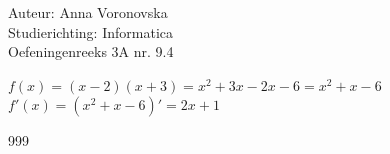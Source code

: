 \documentclass[a4paper]{article}
\begin{document}
\noindent \large Auteur: Anna Voronovska \\
\noindent \large Studierichting: Informatica \\
\noindent \large Oefeningenreeks 3A nr. 9.4 \\

\bigskip 

\normalsize

$f(x) = (x - 2)(x + 3)= x^2 + 3x - 2x - 6 = x^2 + x - 6$\\

$f'(x) = (x^2 + x - 6)' = 2x + 1$\\



\begin{thebibliography}{999}
\end{thebibliography}
\end{document}
